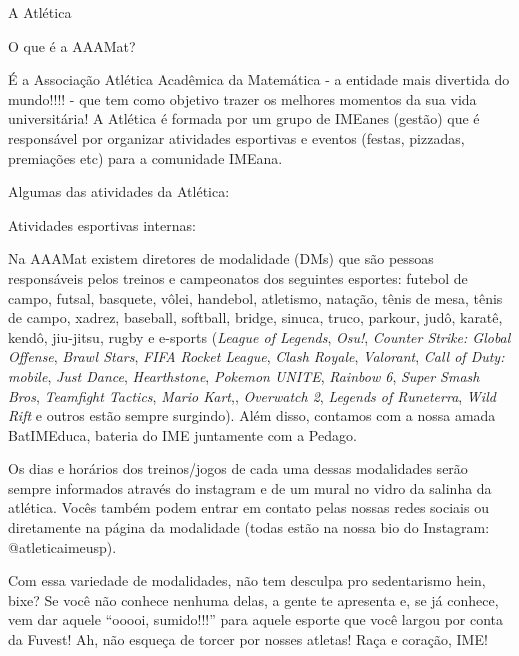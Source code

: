 \begin{secao}{A Atlética} %

\begin{subsecao}{O que é a AAAMat?}

É a Associação Atlética Acadêmica da Matemática - a entidade mais divertida do
mundo!!!! - que tem como objetivo trazer os melhores momentos da sua vida
universitária! A Atlética é formada por um grupo de IMEanes (gestão) que é
responsável por organizar atividades esportivas e eventos (festas, pizzadas,
premiações etc) para a comunidade IMEana.

\end{subsecao}

Algumas das atividades da Atlética:

\begin{subsecao}{Atividades esportivas internas:}

Na AAAMat existem diretores de modalidade (DMs) que são pessoas responsáveis
pelos treinos e campeonatos dos seguintes esportes: futebol de campo, futsal,
basquete, vôlei, handebol, atletismo, natação, tênis de mesa, tênis de campo,
xadrez, baseball, softball, bridge, sinuca, truco, parkour, judô, karatê,
kendô, jiu-jitsu, rugby e e-sports (\textit{League of Legends}, \textit{Osu!},
\textit{Counter Strike: Global Offense}, \textit{Brawl Stars}, \textit{FIFA}
\textit{Rocket League}, \textit{Clash Royale}, \textit{Valorant},
\textit{Call of Duty: mobile}, \textit{Just Dance}, \textit{Hearthstone},
\textit{Pokemon UNITE}, \textit{Rainbow 6}, \textit{Super Smash Bros},
\textit{Teamfight Tactics}, \textit{Mario Kart},, \textit{Overwatch 2},
\textit{Legends of Runeterra}, \textit{Wild Rift} e outros estão sempre surgindo).
Além disso, contamos com a nossa amada BatIMEduca, bateria do IME juntamente
com a Pedago.

Os dias e horários dos treinos/jogos de cada uma dessas modalidades serão
sempre informados através do instagram e de um mural no vidro da salinha da atlética.
Vocês também podem entrar em contato pelas nossas redes sociais ou diretamente
na página da modalidade (todas estão na nossa bio do Instagram: @atleticaimeusp).

Com essa variedade de modalidades, não tem desculpa pro sedentarismo hein,
bixe? Se você não conhece nenhuma delas, a gente te apresenta e, se já conhece,
vem dar aquele “ooooi, sumido!!!” para aquele esporte que você largou por conta
da Fuvest! Ah, não esqueça de torcer por nosses atletas! Raça e coração, IME!


\end{subsecao}
\end{secao}
